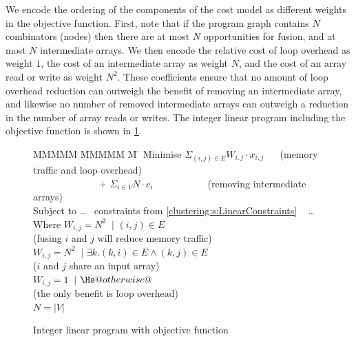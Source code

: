 We encode the ordering of the components of the cost model as different weights in the objective function.
First, note that if the program graph contains $N$ combinators (nodes) then there are at most $N$ opportunities for fusion, and at most $N$ intermediate arrays.
We then encode the relative cost of loop overhead as weight $1$, the cost of an intermediate array as weight $N$, and the cost of an array read or write as weight $N^2$.
These coefficients ensure that no amount of loop overhead reduction can outweigh the benefit of removing an intermediate array, and likewise no number of removed intermediate arrays can outweigh a reduction in the number of array reads or writes.
The integer linear program including the objective function is shown in \cref{fig:clustering:ilp-obj}.

\begin{figure}
\begin{tabbing}
MMMMM   \= MMMMM \= M \= \kill
Minimise   \>     $\Sigma_{(i,j) \in E} W_{i,j} \cdot x_{i,j}$   
                        ~~ (memory traffic and loop overhead)
\\ ~~~~~~~~~~~~~ $+$ \> $\Sigma_{i \in V} N \cdot c_i$
                        ~~~~~~~~~~ (removing intermediate arrays)
\\[1ex]
   Subject to  \> \ldots ~ constraints from \cref{clustering:s:LinearConstraints} ~ \ldots 
\\ Where   \> $W_{i,j} = N^2$ \> $~|$ \> $(i,j) \in E $         
\\         \> \> \> (fusing $i$ and $j$ will reduce memory traffic)         
\\         \> $W_{i,j} = N^2$ \> $~|$ \> $\exists k. (k,i) \in E \wedge (k,j) \in E $     
\\         \> \> \> ($i$ and $j$ share an input array)
\\         \> $W_{i,j} = 1$   \> $~|$ \> $\Hs@otherwise@$
\\         \> \> \> (the only benefit is loop overhead)
\\         \> $N = |V|$
\end{tabbing}
\caption{Integer linear program with objective function}
\label{fig:clustering:ilp-obj}
\end{figure}




